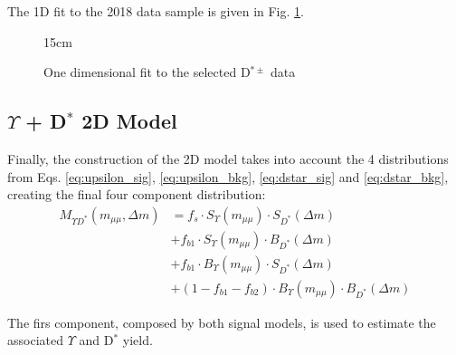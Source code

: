 The 1D fit to the 2018 data sample is given in Fig. \ref{fig:fit1D_dstar}.

\begin{figure}[!htm]{15cm}
  \caption{One dimensional fit to the selected D$^{*\pm}$ data}%
  \label{fig:fit1D_dstar}
\end{figure}

\subsection{\texorpdfstring{$\Upsilon$ + D$^{*}$}{Y+D*} 2D Model}

Finally, the construction of the 2D model takes into account the 4 distributions from Eqs. \ref{eq:upsilon_sig}, \ref{eq:upsilon_bkg}, \ref{eq:dstar_sig} and \ref{eq:dstar_bkg}, creating the final four component distribution:
\begin{equation}
  \begin{split}
    M_{\Upsilon D^*}(m_{\mu\mu}, \Delta m) & = f_s \cdot S_\Upsilon(m_{\mu\mu}) \cdot S_{D^*}(\Delta m) \\
    & + f_{b1} \cdot S_\Upsilon(m_{\mu\mu}) \cdot B_{D^*}(\Delta m) \\
    & + f_{b1} \cdot B_\Upsilon(m_{\mu\mu}) \cdot S_{D^*}(\Delta m) \\
    & + (1-f_{b1}-f_{b2}) \cdot B_\Upsilon(m_{\mu\mu}) \cdot B_{D^*}(\Delta m)
  \end{split}
\end{equation}

The firs component, composed by both signal models, is used to estimate the associated $\Upsilon$ and D$^*$ yield.

